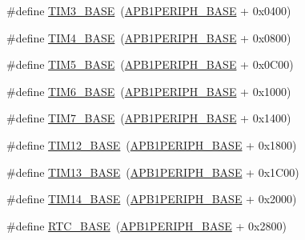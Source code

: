 \begin{DoxyCompactItemize}
\item 
\#define \hyperlink{group___peripheral__memory__map_gaf0c34a518f87e1e505cd2332e989564a}{T\+I\+M3\+\_\+\+B\+A\+SE}~(\hyperlink{group___peripheral__memory__map_ga45666d911f39addd4c8c0a0ac3388cfb}{A\+P\+B1\+P\+E\+R\+I\+P\+H\+\_\+\+B\+A\+SE} + 0x0400)
\item 
\#define \hyperlink{group___peripheral__memory__map_ga56e2d44b0002f316527b8913866a370d}{T\+I\+M4\+\_\+\+B\+A\+SE}~(\hyperlink{group___peripheral__memory__map_ga45666d911f39addd4c8c0a0ac3388cfb}{A\+P\+B1\+P\+E\+R\+I\+P\+H\+\_\+\+B\+A\+SE} + 0x0800)
\item 
\#define \hyperlink{group___peripheral__memory__map_ga3e1671477190d065ba7c944558336d7e}{T\+I\+M5\+\_\+\+B\+A\+SE}~(\hyperlink{group___peripheral__memory__map_ga45666d911f39addd4c8c0a0ac3388cfb}{A\+P\+B1\+P\+E\+R\+I\+P\+H\+\_\+\+B\+A\+SE} + 0x0\+C00)
\item 
\#define \hyperlink{group___peripheral__memory__map_ga8268ec947929f192559f28c6bf7d1eac}{T\+I\+M6\+\_\+\+B\+A\+SE}~(\hyperlink{group___peripheral__memory__map_ga45666d911f39addd4c8c0a0ac3388cfb}{A\+P\+B1\+P\+E\+R\+I\+P\+H\+\_\+\+B\+A\+SE} + 0x1000)
\item 
\#define \hyperlink{group___peripheral__memory__map_ga0ebf54364c6a2be6eb19ded6b18b6387}{T\+I\+M7\+\_\+\+B\+A\+SE}~(\hyperlink{group___peripheral__memory__map_ga45666d911f39addd4c8c0a0ac3388cfb}{A\+P\+B1\+P\+E\+R\+I\+P\+H\+\_\+\+B\+A\+SE} + 0x1400)
\item 
\#define \hyperlink{group___peripheral__memory__map_ga33dea32fadbaecea161c2ef7927992fd}{T\+I\+M12\+\_\+\+B\+A\+SE}~(\hyperlink{group___peripheral__memory__map_ga45666d911f39addd4c8c0a0ac3388cfb}{A\+P\+B1\+P\+E\+R\+I\+P\+H\+\_\+\+B\+A\+SE} + 0x1800)
\item 
\#define \hyperlink{group___peripheral__memory__map_gad20f79948e9359125a40bbf6ed063590}{T\+I\+M13\+\_\+\+B\+A\+SE}~(\hyperlink{group___peripheral__memory__map_ga45666d911f39addd4c8c0a0ac3388cfb}{A\+P\+B1\+P\+E\+R\+I\+P\+H\+\_\+\+B\+A\+SE} + 0x1\+C00)
\item 
\#define \hyperlink{group___peripheral__memory__map_ga862855347d6e1d92730dfe17ee8e90b8}{T\+I\+M14\+\_\+\+B\+A\+SE}~(\hyperlink{group___peripheral__memory__map_ga45666d911f39addd4c8c0a0ac3388cfb}{A\+P\+B1\+P\+E\+R\+I\+P\+H\+\_\+\+B\+A\+SE} + 0x2000)
\item 
\#define \hyperlink{group___peripheral__memory__map_ga4265e665d56225412e57a61d87417022}{R\+T\+C\+\_\+\+B\+A\+SE}~(\hyperlink{group___peripheral__memory__map_ga45666d911f39addd4c8c0a0ac3388cfb}{A\+P\+B1\+P\+E\+R\+I\+P\+H\+\_\+\+B\+A\+SE} + 0x2800)

\end{DoxyCompactItemize}
